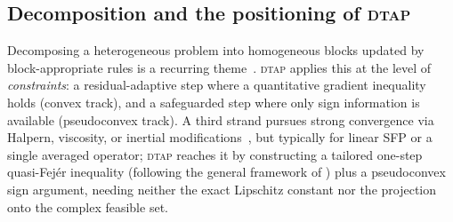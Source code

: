 \documentclass[]{interact}
\theoremstyle{plain}
\theoremstyle{definition}
\theoremstyle{remark}
\newcommand{\dtap}{\textsc{dtap}}
\begin{document}
\subsection{Decomposition and the positioning of \textsc{dtap}}\label{ssec:rel-position}
Decomposing a heterogeneous problem into homogeneous blocks updated by block-appropriate rules is
a recurring theme~\citep{boyd2011admm,combettes2011}. \dtap{} applies this at the level of
\emph{constraints}: a residual-adaptive step where a quantitative gradient inequality holds
(convex track), and a safeguarded step where only sign information is available
(pseudoconvex track). A third strand pursues strong convergence via Halpern, viscosity, or
inertial modifications~\citep{xu2010,combettes2011}, but typically for linear SFP or a single
averaged operator; \dtap{} reaches it by constructing a tailored one-step quasi-Fej\'er inequality
(following the general framework of \citealt{combettes2001quasifejer}) plus a pseudoconvex sign
argument, needing neither the exact Lipschitz constant nor the projection onto the complex feasible
set.
\end{document}
